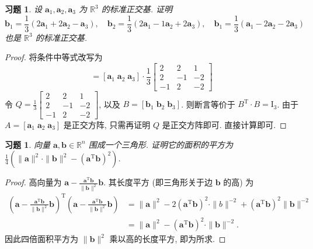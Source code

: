 \documentclass[UTF8]{ctexart}
\newtheorem{ex}[thm]{习题}
\begin{document}
\begin{ex}
  设 \(\boldsymbol{a}_1, \boldsymbol{a}_2, \boldsymbol{a}_3\)
  为 \(\mathbb{R}^3\) 的标准正交基.
  证明
  \begin{equation*}
    \boldsymbol{b}_1 = \frac{1}{3}(2\boldsymbol{a}_1 + 2\boldsymbol{a}_2 - \boldsymbol{a}_3), \quad
    \boldsymbol{b}_2 = \frac{1}{3}(2\boldsymbol{a}_1 - 1\boldsymbol{a}_2 + 2\boldsymbol{a}_3), \quad
    \boldsymbol{b}_1 = \frac{1}{3}(\boldsymbol{a}_1 - 2\boldsymbol{a}_2 - 2\boldsymbol{a}_3)
  \end{equation*}
  也是 \(\mathbb{R}^3\) 的标准正交基.
\end{ex}

\begin{proof}
  将条件中等式改写为
  \begin{equation*}
    [\boldsymbol{b}_1 \; \boldsymbol{b}_2 \; \boldsymbol{b}_3] =
    [\boldsymbol{a}_1 \; \boldsymbol{a}_2 \; \boldsymbol{a}_3] \cdot
    \frac{1}{3}
    \begin{bmatrix}
      2 & 2 & 1 \\
      2 &  -1 & -2 \\
      -1 & 2 & -2
    \end{bmatrix}
  \end{equation*}
  令
  \(
  Q =\frac{1}{3}
  \begin{bmatrix}
    2 & 2 & 1 \\
    2 &  -1 & -2 \\
    -1 & 2 & -2
  \end{bmatrix}
  \),
  以及 \(B = [\boldsymbol{b}_1 \; \boldsymbol{b}_2 \; \boldsymbol{b}_3]\).
  则断言等价于 \(B^{\mathrm{T}} \cdot B = \mathrm{I}_3\).
  由于 \(A = [\boldsymbol{a}_1 \; \boldsymbol{a}_2 \; \boldsymbol{a}_3]\)
  是正交方阵, 只需再证明 \(Q\) 是正交方阵即可. 直接计算即可.
\end{proof}

\begin{ex}
  向量 \(\boldsymbol{a}, \boldsymbol{b} \in \mathbb{R}^n\)
  围成一个三角形. 证明它的面积的平方为
  \(\frac{1}{4}(\|\boldsymbol{a}\|^{2} \cdot \|\boldsymbol{b}\|^2 - (\boldsymbol{a}^{\mathrm{T}}\boldsymbol{b})^2)\).
\end{ex}

\begin{proof}
  高向量为 \(\boldsymbol{a} - \frac{\boldsymbol{a}^{\mathrm{T}}\boldsymbol{b}}{\|\boldsymbol{b}\|^2}\boldsymbol{b}\).
  其长度平方 (即三角形关于边 \(\boldsymbol{b}\) 的高) 为
  \begin{align*}
    \left(\boldsymbol{a} - \frac{\boldsymbol{a}^{\mathrm{T}}\boldsymbol{b}}{\|\boldsymbol{b}\|^2}\boldsymbol{b}\right)^{\mathrm{T}}\left(\boldsymbol{a} - \frac{\boldsymbol{a}^{\mathrm{T}}\boldsymbol{b}}{\|\boldsymbol{b}\|^2}\boldsymbol{b}\right)
    & = \|\boldsymbol{a}\|^2 - 2(\boldsymbol{a}^{\mathrm{T}}\boldsymbol{b})^2 \cdot \|b\|^{-2}  + (\boldsymbol{a}^{\mathrm{T}}\boldsymbol{b})^2 \|\boldsymbol{b}\|^{-2}\\
    &= \|\boldsymbol{a}\|^2 - (\boldsymbol{a}^{\mathrm{T}}\boldsymbol{b})^2 \cdot \|\boldsymbol{b}\|^{-2}.
  \end{align*}
  因此四倍面积平方为 \(\|\boldsymbol{b}\|^2\) 乘以高的长度平方, 即为所求.
\end{proof}
\end{document}
